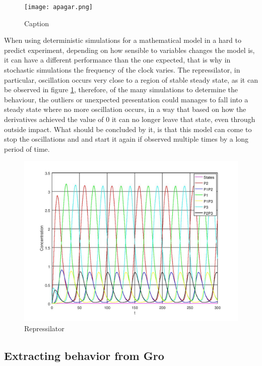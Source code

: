 \documentclass[12pt]{article}
\begin{document}
\begin{figure}[h]
    \centering
    \texttt{[image: apagar.png]}
    \caption{Caption}
    \label{fig:phase_plane_repressilator}
\end{figure}

When using deterministic simulations for a mathematical model in a hard to predict experiment, depending on how sensible to variables changes the model is, it can have a different performance than the one expected, that is why in stochastic simulations the frequency of the clock varies. The repressilator, in particular, oscillation occurs very close to a region of stable steady state, as it can be observed in figure \ref{fig:phase_plane_repressilator}, therefore, of the many simulations to determine the behaviour, the outliers or unexpected presentation could manages to fall into a steady state where no more oscillation occurs, in a way that based on how the derivatives achieved the value of 0 it can no longer leave that state, even through outside impact. What should be concluded by it, is that this model can come to stop the oscillations and and start it again if observed multiple times by a long period of time.

\begin{figure}[ht]
\centering
\includegraphics[width=.5\textwidth]{repressilator.jpg}
\caption{Repressilator}
\label{fig:repressilator}
\end{figure}

\subsection{Extracting behavior from Gro}
\end{document}
